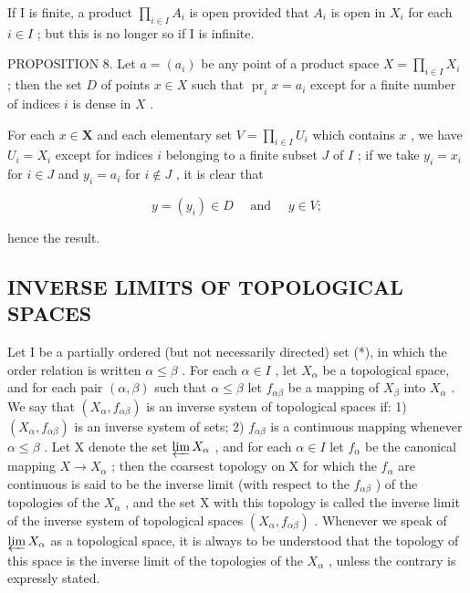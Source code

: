 If I is finite, a product \(\prod_{i\in I}A_i\) is open provided that \(A_i\) is open in \(X_i\) for each \(i\in I\) ; but this is no longer so if I is infinite.

PROPOSITION 8. Let \(a = (a_{i})\) be any point of a product space \(X = \prod_{i \in I} X_{i}\) ; then the set \(D\) of points \(x \in X\) such that \(\operatorname{pr}_{i} x = a_{i}\) except for a finite number of indices \(i\) is dense in \(X\) .

For each \(x \in \mathbf{X}\) and each elementary set \(V = \prod_{i \in I} U_i\) which contains \(x\) , we have \(U_i = X_i\) except for indices \(i\) belonging to a finite subset \(J\) of \(I\) ; if we take \(y_i = x_i\) for \(i \in J\) and \(y_i = a_i\) for \(i \notin J\) , it is clear that

\[
y = (y _ {i}) \in D \quad \text { and } \quad y \in V;
\]

hence the result.

\subsection{INVERSE LIMITS OF TOPOLOGICAL SPACES}

Let I be a partially ordered (but not necessarily directed) set (*), in which the order relation is written \(\alpha \leqslant \beta\) . For each \(\alpha \in I\) , let \(X_{\alpha}\) be a topological space, and for each pair \((\alpha, \beta)\) such that \(\alpha \leqslant \beta\) let \(f_{\alpha\beta}\) be a mapping of \(X_{\beta}\) into \(X_{\alpha}\) . We say that \((X_{\alpha}, f_{\alpha\beta})\) is an inverse system of topological spaces if: 1) \((X_{\alpha}, f_{\alpha\beta})\) is an inverse system of sets; 2) \(f_{\alpha\beta}\) is a continuous mapping whenever \(\alpha \leqslant \beta\) . Let X denote the set \(\varprojlim X_{\alpha}\) , and for each \(\alpha \in I\) let \(f_{\alpha}\) be the canonical mapping \(X \to X_{\alpha}\) ; then the coarsest topology on X for which the \(f_{\alpha}\) are continuous is said to be the inverse limit (with respect to the \(f_{\alpha\beta}\) ) of the topologies of the \(X_{\alpha}\) , and the set X with this topology is called the inverse limit of the inverse system of topological spaces \((X_{\alpha}, f_{\alpha\beta})\) . Whenever we speak of \(\varprojlim X_{\alpha}\) as a topological space, it is always to be understood that the topology of this space is the inverse limit of the topologies of the \(X_{\alpha}\) , unless the contrary is expressly stated.


